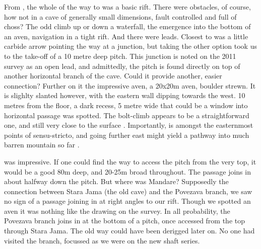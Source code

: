 From , the whole of the way to  was a basic rift. There were obstacles, of course, how not in a cave of generally small dimensions, fault controlled and full of choss? The odd climb up or down a waterfall, the emergence into the bottom of an aven, navigation in a tight rift. And there were leads. Closest to  was a little carbide arrow pointing the way at a junction, but taking the other option took us to the take-off of a 10 metre deep pitch. This junction is noted on the 2011 survey as an open lead, and admittedly, the pitch is found directly on top of another horizontal branch of the cave. Could it provide another, easier connection? Further on it the impressive  aven, a 20x20m aven, boulder strewn. It is slighlty slanted however, with the eastern wall dipping towards the west. 10 metres from the floor, a dark recess, 5 metre wide  that could be a window into horizontal passage was spotted. The bolt-climb appears to be a straightforward one, and still very close to the surface . Importantly,  is amongst the easternmost points of  sensu-stricto, and going further east might yield a pathway into much barren mountain so far .



 was impressive. If one could find the way to access the pitch from the very top, it would be a good 80m deep, and 20-25m broad throughout. The passage joins in about halfway down the pitch. But where was Mandare? Supposedly the connection between Stara Jama (the old cave) and the Povezava branch, we saw no sign of a passage joining in at right angles to our rift. Though we spotted an aven it was nothing like the drawing on the survey. In all probability, the Povezava branch joins in at the bottom of a pitch, once accessed from the top through Stara Jama. The old way could have been derigged later on. No one had visited the  branch, focussed as we were on the new shaft series. 

